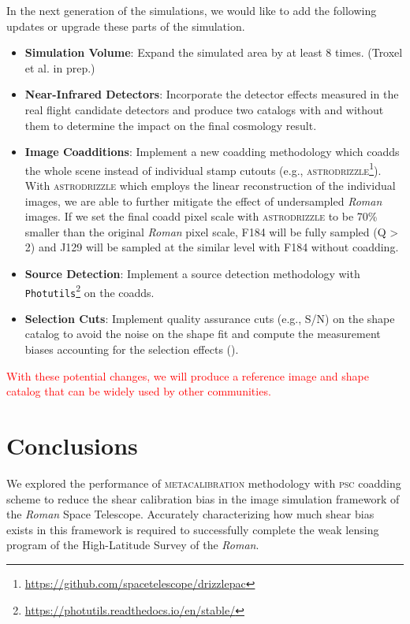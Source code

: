 \documentclass[fleqn,usenatbib]{mnras}
\begin{document}
In the next generation of the simulations, we would like to add the following updates or upgrade these parts of the simulation. 
\begin{itemize}
    \setlength\itemsep{1em}
    \item \textbf{Simulation Volume}: Expand the simulated area by at least 8 times. (Troxel et al. in prep.)
    
    \item \textbf{Near-Infrared Detectors}: Incorporate the detector effects measured in the real flight candidate detectors and produce two catalogs with and without them to determine the impact on the final cosmology result.
    
    \item \textbf{Image Coadditions}: Implement a new coadding methodology which coadds the whole scene instead of individual stamp cutouts (e.g., \textsc{astrodrizzle}\footnote{\url{https://github.com/spacetelescope/drizzlepac}}). With \textsc{astrodrizzle} which employs the linear reconstruction of the individual images, we are able to further mitigate the effect of undersampled \emph{Roman} images. If we set the final coadd pixel scale with \textsc{astrodrizzle} to be 70\% smaller than the original \emph{Roman} pixel scale, F184 will be fully sampled (Q > 2) and J129 will be sampled at the similar level with F184 without coadding. 
    
    \item \textbf{Source Detection}: Implement a source detection methodology with \texttt{Photutils}\footnote{\url{https://photutils.readthedocs.io/en/stable/}} on the coadds.
    
    \item \textbf{Selection Cuts}: Implement quality assurance cuts (e.g., S/N) on the shape catalog to avoid the noise on the shape fit and compute the measurement biases accounting for the selection effects (\citealt{2017ApJ...841...24S}). 
\end{itemize}
\textcolor{red}{With these potential changes, we will produce a reference image and shape catalog that can be widely used by other communities.}


\section{Conclusions}
\label{sec:conclusion}
We explored the performance of \textsc{metacalibration} methodology with \textsc{psc} coadding scheme to reduce the shear calibration bias in the image simulation framework of the \emph{Roman} Space Telescope. Accurately characterizing how much shear bias exists in this framework is required to successfully complete the weak lensing program of the High-Latitude Survey of the \emph{Roman}. \par
\end{document}
